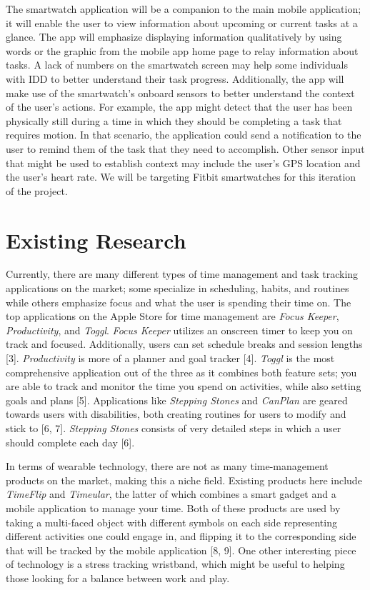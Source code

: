\documentclass[12pt,letterpaper]{article}
\begin{document}
The smartwatch application will be a companion to the main mobile application; it will enable the user to view information about upcoming or current tasks at a glance. The app will emphasize displaying information qualitatively by using words or the graphic from the mobile app home page to relay information about tasks. A lack of numbers on the smartwatch screen may help some individuals with IDD to better understand their task progress. Additionally, the app will make use of the smartwatch’s onboard sensors to better understand the context of the user’s actions. For example, the app might detect that the user has been physically still during a time in which they should be completing a task that requires motion. In that scenario, the application could send a notification to the user to remind them of the task that they need to accomplish. Other sensor input that might be used to establish context may include the user’s GPS location and the user’s heart rate. We will be targeting Fitbit smartwatches for this iteration of the project.


\newpage
\section{Existing Research}

Currently, there are many different types of time management and task tracking applications on the market; some specialize in scheduling, habits, and routines while others emphasize focus and what the user is spending their time on. The top applications on the Apple Store for time management are \textit{Focus Keeper}, \textit{Productivity}, and \textit{Toggl}. \textit{Focus Keeper} utilizes an onscreen timer to keep you on track and focused. Additionally, users can set schedule breaks and session lengths [3]. \textit{Productivity} is more of a planner and goal tracker [4]. \textit{Toggl} is the most comprehensive application out of the three as it combines both feature sets; you are able to track and monitor the time you spend on activities, while also setting goals and plans [5]. Applications like \textit{Stepping Stones} and \textit{CanPlan} are geared towards users with disabilities, both creating routines for users to modify and stick to [6, 7]. \textit{Stepping Stones} consists of very detailed steps in which a user should complete each day [6].

In terms of wearable technology, there are not as many time-management products on the market, making this a niche field. Existing products here include \textit{TimeFlip} and \textit{Timeular}, the latter of which combines a smart gadget and a mobile application to manage your time. Both of these products are used by taking a multi-faced object with different symbols on each side representing different activities one could engage in, and flipping it to the corresponding side that will be tracked by the mobile application [8, 9]. One other interesting piece of technology is a stress tracking wristband, which might be useful to helping those looking for a balance between work and play.
\end{document}
